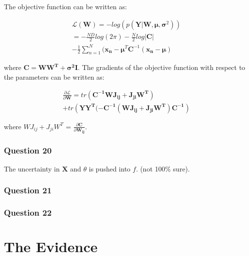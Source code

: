 \documentclass[10pt, a4paper, twocolumn]{article} %
\begin{document}
The objective function can be written as:

\begin{multline}
  \mathcal{L}(\mathbf{W}) = -log(p(\mathbf{Y}|\mathbf{W}, \bm{\mu}, \bm{\sigma}^2)) \\
  = -\frac{ND}{2}log(2\pi) - \frac{N}{2}log|\mathbf{C}| \\
     - \frac{1}{2}\sum^N_{n=1}(\mathbf{x_n} - \bm{\mu}^T\mathbf{C}^{-1}(\mathbf{x_n} - \bm{\mu})
\end{multline}

where $\mathbf{C} = \mathbf{WW^T} + \bm{\sigma^2}\mathbf{I}$. The gradients of the objective function with respect to the parameters can be written as:

\begin{multline}
  \frac{\partial \mathcal{L}}{\partial \mathbf{W}} = tr(\mathbf{C^{-1}WJ_{ij} +  J_{ji}W^T}) \\
  + tr(\mathbf{YY^T(-C^{-1}(WJ_{ij} +  J_{ji}W^T)C^{-1}})
\end{multline}

where $WJ_{ij} +  J_{ji}W^T$ = $\frac{\partial \mathbf{C}}{\partial \mathbf{W_{ij}}}$.

\subsubsection*{Question 20}
The uncertainty in $\mathbf{X}$ and $\theta$ is pushed into $f$. (not 100\% sure). 

\subsubsection*{Question 21}



\subsubsection*{Question 22}

\section{The Evidence}


\printbibliography[title={Bibliography}] %

\end{document}
